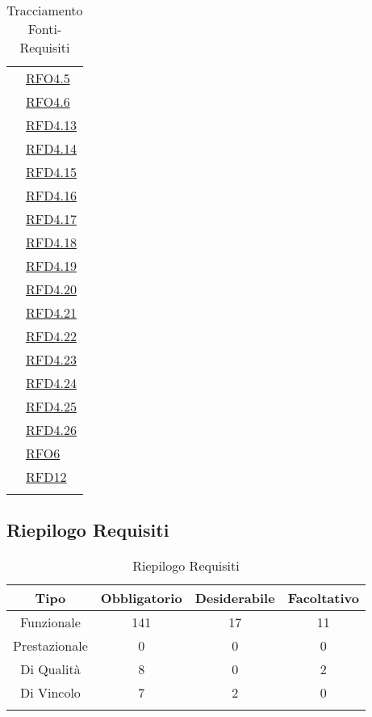 \begin{longtable}{|>{\centering}m{5cm}|m{5cm}<{\centering}|}
& \hyperlink{RFO4.5}{RFO4.5}\\
& \hyperlink{RFO4.6}{RFO4.6}\\
& \hyperlink{RFD4.13}{RFD4.13}\\
& \hyperlink{RFD4.14}{RFD4.14}\\
& \hyperlink{RFD4.15}{RFD4.15}\\
& \hyperlink{RFD4.16}{RFD4.16}\\
& \hyperlink{RFD4.17}{RFD4.17}\\
& \hyperlink{RFD4.18}{RFD4.18}\\
& \hyperlink{RFD4.19}{RFD4.19}\\
& \hyperlink{RFD4.20}{RFD4.20}\\
& \hyperlink{RFD4.21}{RFD4.21}\\
& \hyperlink{RFD4.22}{RFD4.22}\\
& \hyperlink{RFD4.23}{RFD4.23}\\
& \hyperlink{RFD4.24}{RFD4.24}\\
& \hyperlink{RFD4.25}{RFD4.25}\\
& \hyperlink{RFD4.26}{RFD4.26}\\
& \hyperlink{RFO6}{RFO6}\\ 
& \hyperlink{RFD12}{RFD12}\\ \hline
\caption[Tracciamento Fonti-Requisiti]{Tracciamento Fonti-Requisiti}
\label{tabella:fonti-requi}
\end{longtable}
\clearpage

\subsection{Riepilogo Requisiti}
\normalsize
\begin{longtable}{|c|c|c|c|}
\hline
\textbf{Tipo} & \textbf{Obbligatorio} & \textbf{Desiderabile} & \textbf{Facoltativo}\\
\hline
Funzionale & 141 & 17 & 11\\ \hline
Prestazionale & 0 & 0 & 0\\ \hline
Di Qualità & 8 & 0 & 2\\ \hline
Di Vincolo & 7 & 2 & 0\\ \hline
\caption[Riepilogo Requisiti]{Riepilogo Requisiti}
\label{tabella:riepilogorequi}
\end{longtable}
\clearpage






